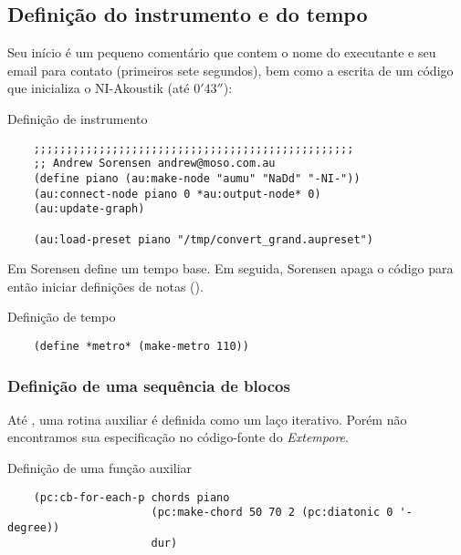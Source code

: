 \subsection{Definição do instrumento e do tempo}\label{sec:define_instr}

Seu início é um pequeno comentário que contem o nome do executante e seu email para contato (primeiros sete segundos), bem como a escrita de um código que inicializa o NI-Akoustik (até 0$'$43$''$): 

\begin{example}{Definição de instrumento}
  \begin{verbatim}
    ;;;;;;;;;;;;;;;;;;;;;;;;;;;;;;;;;;;;;;;;;;;;;;;;;
    ;; Andrew Sorensen andrew@moso.com.au
    (define piano (au:make-node "aumu" "NaDd" "-NI-"))
    (au:connect-node piano 0 *au:output-node* 0)
    (au:update-graph)

    (au:load-preset piano "/tmp/convert_grand.aupreset")
  \end{verbatim}
  \label{fig:SIK_piano}
\end{example}


Em  Sorensen define um tempo base. Em seguida, Sorensen apaga o código para então iniciar definições de notas ().

\begin{example}{Definição de tempo}\label{ex:def_tempo}
  \centering
  \begin{verbatim}
    (define *metro* (make-metro 110))
  \end{verbatim}
  
\end{example}

\subsubsection{Definição de uma sequência de blocos}

Até , uma rotina auxiliar é definida como um laço iterativo. Porém não encontramos sua especificação no código-fonte do \emph{Extempore}.

\begin{example}{Definição de uma função auxiliar}
  \begin{verbatim}
    (pc:cb-for-each-p chords piano
                      (pc:make-chord 50 70 2 (pc:diatonic 0 '- degree))
                      dur)
  \end{verbatim}
\end{example}

